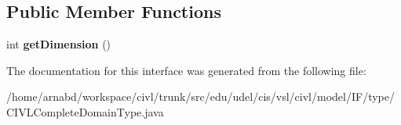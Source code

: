 \subsection*{Public Member Functions}
\begin{DoxyCompactItemize}
\item 
\hypertarget{interfaceedu_1_1udel_1_1cis_1_1vsl_1_1civl_1_1model_1_1IF_1_1type_1_1CIVLCompleteDomainType_a190ea6e83e7319ba5941170a30809a3d}{}int {\bfseries get\+Dimension} ()\label{interfaceedu_1_1udel_1_1cis_1_1vsl_1_1civl_1_1model_1_1IF_1_1type_1_1CIVLCompleteDomainType_a190ea6e83e7319ba5941170a30809a3d}

\end{DoxyCompactItemize}


The documentation for this interface was generated from the following file\+:\begin{DoxyCompactItemize}
\item 
/home/arnabd/workspace/civl/trunk/src/edu/udel/cis/vsl/civl/model/\+I\+F/type/C\+I\+V\+L\+Complete\+Domain\+Type.\+java\end{DoxyCompactItemize}
